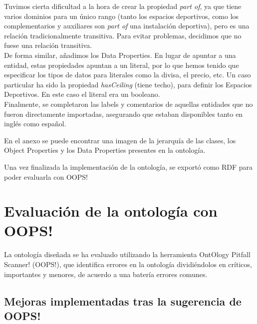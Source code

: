 \documentclass[a4paper,12pt]{article}
\begin{document}
	Tuvimos cierta dificultad a la hora de crear la propiedad \textit{part of}, ya que tiene varios dominios para un único rango (tanto los espacios deportivos, como los complementarios y auxiliares son \textit{part of} una instalación deportiva), pero es una relación tradicionalmente transitiva. Para evitar problemas, decidimos que no fuese una relación transitiva.\\
		
	De forma similar, añadimos los Data Properties. En lugar de apuntar a una entidad, estas propiedades apuntan a un literal, por lo que hemos tenido que especificar los tipos de datos para literales como la divisa, el precio, etc. Un caso particular ha sido la propiedad \textit{hasCeiling} (tiene techo), para definir los Espacios Deportivos. En este caso el literal era un booleano.\\
	
	Finalmente, se completaron las labels y comentarios de aquellas entidades que no fueron directamente importadas, asegurando que estaban disponibles tanto en inglés como español. 
	
	En el anexo se puede encontrar una imagen de la jerarquía de las clases, los Object Properties y los Data Properties presentes en la ontología.
	
	Una vez finalizada la implementación de la ontología, se exportó como RDF para poder evaluarla con OOPS!
	
	\section{Evaluación de la ontología con OOPS!}
	La ontología diseñada se ha evaluado utilizando la herramienta OntOlogy Pitfall Scanner! (OOPS!)\cite{oops}, que identifica errores en la ontología dividiéndolos en críticos, importantes y menores, de acuerdo a una batería errores comunes.
	
	\subsection{Mejoras implementadas tras la sugerencia de OOPS!}
	
\end{document}
